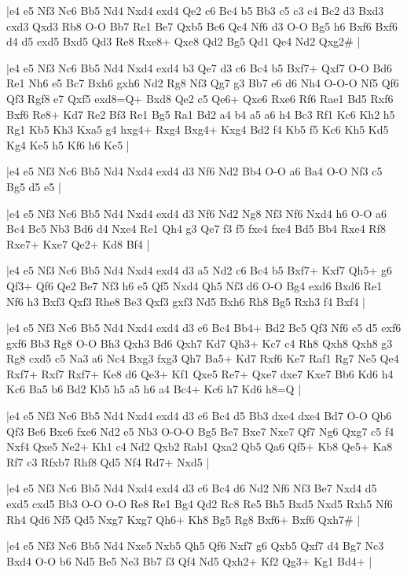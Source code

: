 \whitename{}
\blackname{}
\makegametitle
|e4 e5 Nf3 Nc6 Bb5 Nd4 Nxd4 exd4 Qe2 c6 Bc4 b5 Bb3 c5 c3 c4 Bc2 d3 Bxd3 cxd3 Qxd3 Rb8 O-O Bb7 Re1 Be7 Qxb5 Bc6 Qc4 Nf6 d3 O-O Bg5 h6 Bxf6 Bxf6 d4 d5 exd5 Bxd5 Qd3 Re8 Rxe8+ Qxe8 Qd2 Bg5 Qd1 Qe4 Nd2 Qxg2\#  |

\whitename{}
\blackname{}
\makegametitle
|e4 e5 Nf3 Nc6 Bb5 Nd4 Nxd4 exd4 b3 Qe7 d3 c6 Bc4 b5 Bxf7+ Qxf7 O-O Bd6 Re1 Nh6 e5 Bc7 Bxh6 gxh6 Nd2 Rg8 Nf3 Qg7 g3 Bb7 e6 d6 Nh4 O-O-O Nf5 Qf6 Qf3 Rgf8 e7 Qxf5 exd8=Q+ Bxd8 Qe2 c5 Qe6+ Qxe6 Rxe6 Rf6 Rae1 Bd5 Rxf6 Bxf6 Re8+ Kd7 Re2 Bf3 Re1 Bg5 Ra1 Bd2 a4 b4 a5 a6 h4 Bc3 Rf1 Kc6 Kh2 h5 Rg1 Kb5 Kh3 Kxa5 g4 hxg4+ Rxg4 Bxg4+ Kxg4 Bd2 f4 Kb5 f5 Kc6 Kh5 Kd5 Kg4 Ke5 h5 Kf6 h6 Ke5  |

\whitename{}
\blackname{}
\makegametitle
|e4 e5 Nf3 Nc6 Bb5 Nd4 Nxd4 exd4 d3 Nf6 Nd2 Bb4 O-O a6 Ba4 O-O Nf3 c5 Bg5 d5 e5  |

\whitename{}
\blackname{}
\makegametitle
|e4 e5 Nf3 Nc6 Bb5 Nd4 Nxd4 exd4 d3 Nf6 Nd2 Ng8 Nf3 Nf6 Nxd4 h6 O-O a6 Bc4 Bc5 Nb3 Bd6 d4 Nxe4 Re1 Qh4 g3 Qe7 f3 f5 fxe4 fxe4 Bd5 Bb4 Rxe4 Rf8 Rxe7+ Kxe7 Qe2+ Kd8 Bf4  |

\whitename{}
\blackname{}
\makegametitle
|e4 e5 Nf3 Nc6 Bb5 Nd4 Nxd4 exd4 d3 a5 Nd2 c6 Bc4 b5 Bxf7+ Kxf7 Qh5+ g6 Qf3+ Qf6 Qe2 Be7 Nf3 h6 e5 Qf5 Nxd4 Qh5 Nf3 d6 O-O Bg4 exd6 Bxd6 Re1 Nf6 h3 Bxf3 Qxf3 Rhe8 Be3 Qxf3 gxf3 Nd5 Bxh6 Rh8 Bg5 Rxh3 f4 Bxf4  |

\whitename{}
\blackname{}
\makegametitle
|e4 e5 Nf3 Nc6 Bb5 Nd4 Nxd4 exd4 d3 c6 Bc4 Bb4+ Bd2 Bc5 Qf3 Nf6 e5 d5 exf6 gxf6 Bb3 Rg8 O-O Bh3 Qxh3 Bd6 Qxh7 Kd7 Qh3+ Kc7 c4 Rh8 Qxh8 Qxh8 g3 Rg8 cxd5 c5 Na3 a6 Nc4 Bxg3 fxg3 Qh7 Ba5+ Kd7 Rxf6 Ke7 Raf1 Rg7 Ne5 Qe4 Rxf7+ Rxf7 Rxf7+ Ke8 d6 Qe3+ Kf1 Qxe5 Re7+ Qxe7 dxe7 Kxe7 Bb6 Kd6 h4 Kc6 Ba5 b6 Bd2 Kb5 h5 a5 h6 a4 Bc4+ Kc6 h7 Kd6 h8=Q  |

\whitename{}
\blackname{}
\makegametitle
|e4 e5 Nf3 Nc6 Bb5 Nd4 Nxd4 exd4 d3 c6 Bc4 d5 Bb3 dxe4 dxe4 Bd7 O-O Qb6 Qf3 Be6 Bxe6 fxe6 Nd2 e5 Nb3 O-O-O Bg5 Be7 Bxe7 Nxe7 Qf7 Ng6 Qxg7 c5 f4 Nxf4 Qxe5 Ne2+ Kh1 c4 Nd2 Qxb2 Rab1 Qxa2 Qb5 Qa6 Qf5+ Kb8 Qe5+ Ka8 Rf7 c3 Rfxb7 Rhf8 Qd5 Nf4 Rd7+ Nxd5  |

\whitename{}
\blackname{}
\makegametitle
|e4 e5 Nf3 Nc6 Bb5 Nd4 Nxd4 exd4 d3 c6 Bc4 d6 Nd2 Nf6 Nf3 Be7 Nxd4 d5 exd5 cxd5 Bb3 O-O O-O Re8 Re1 Bg4 Qd2 Rc8 Re5 Bh5 Bxd5 Nxd5 Rxh5 Nf6 Rh4 Qd6 Nf5 Qd5 Nxg7 Kxg7 Qh6+ Kh8 Bg5 Rg8 Bxf6+ Bxf6 Qxh7\#  |

\whitename{}
\blackname{}
\makegametitle
|e4 e5 Nf3 Nc6 Bb5 Nd4 Nxe5 Nxb5 Qh5 Qf6 Nxf7 g6 Qxb5 Qxf7 d4 Bg7 Nc3 Bxd4 O-O b6 Nd5 Be5 Ne3 Bb7 f3 Qf4 Nd5 Qxh2+ Kf2 Qg3+ Kg1 Bd4+  |

